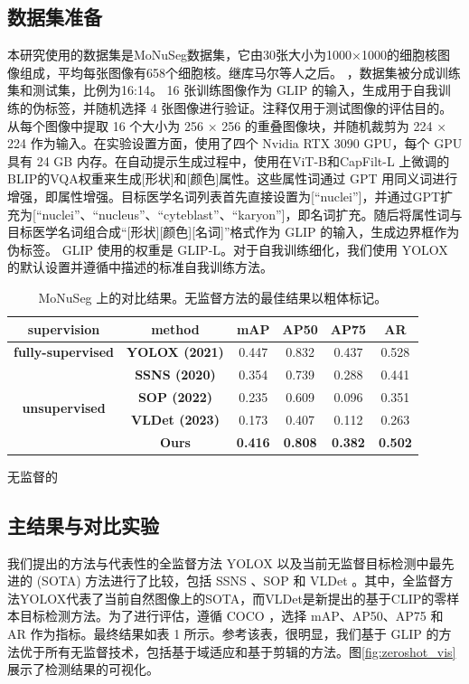 \subsection{数据集准备}
本研究使用的数据集是MoNuSeg数据集\cite{kumar2017dataset}，它由30张大小为1000×1000的细胞核图像组成，平均每张图像有658个细胞核。继库马尔等人之后。 \cite{kumar2017dataset}，数据集被分成训练集和测试集，比例为16:14。 16 张训练图像作为 GLIP 的输入，生成用于自我训练的伪标签，并随机选择 4 张图像进行验证。注释仅用于测试图像的评估目的。从每个图像中提取 16 个大小为 256 × 256 的重叠图像块，并随机裁剪为 224 × 224 作为输入。在实验设置方面，使用了四个 Nvidia RTX 3090 GPU，每个 GPU 具有 24 GB 内存。在自动提示生成过程中，使用在ViT-B和CapFilt-L \cite{li2022blip}上微调的BLIP的VQA权重来生成[形状]和[颜色]属性。这些属性词通过 GPT \cite{radford2019language} 用同义词进行增强，即属性增强。目标医学名词列表首先直接设置为[“nuclei”]，并通过GPT扩充为[“nuclei”、“nucleus”、“cyteblast”、“karyon”]，即名词扩充。随后将属性词与目标医学名词组合成“[形状][颜色][名词]”格式作为 GLIP 的输入，生成边界框作为伪标签。 GLIP 使用的权重是 GLIP-L。对于自我训练细化，我们使用 YOLOX 的默认设置并遵循\cite{dopido2013semisupervised}中描述的标准自我训练方法。
\begin{table}[htbp]
  \centering
  \caption{MoNuSeg \cite{kumar2017dataset} 上的对比结果。无监督方法的最佳结果以粗体标记。}
  \label{tab:zeroshot_comparison}
  \begin{tabular}{c|c|cccc}
    \hline
    \textbf{supervision} & \textbf{method} & \textbf{mAP} & \textbf{AP50} & \textbf{AP75} & \textbf{AR} \\ \hline
    \textbf{fully-supervised} & \textbf{YOLOX (2021)} & 0.447 & 0.832 & 0.437 & 0.528 \\ \hline
    \multirow{4}{*}{\textbf{unsupervised}} & \textbf{SSNS (2020)} & 0.354 & 0.739 & 0.288 & 0.441 \\
     & \textbf{SOP (2022)} & 0.235 & 0.609 & 0.096 & 0.351 \\
     & \textbf{VLDet (2023)} & 0.173 & 0.407 & 0.112 & 0.263 \\
     & \textbf{Ours} & \textbf{0.416} & \textbf{0.808} & \textbf{0.382} & \textbf{0.502} \\ \hline
  \end{tabular}
\end{table}

无监督的
\subsection{主结果与对比实验}
我们提出的方法与代表性的全监督方法 YOLOX \cite{ge2021yolox} 以及当前无监督目标检测中最先进的 (SOTA) 方法进行了比较，包括 SSNS \cite{sahasrabudhe2020self}、SOP \cite{le2022unsupervised} 和 VLDet \cite{lin2022learning}。其中，全监督方法YOLOX代表了当前自然图像上的SOTA，而VLDet是新提出的基于CLIP的零样本目标检测方法。为了进行评估，遵循 COCO \cite{lin2014microsoft}，选择 mAP、AP50、AP75 和 AR 作为指标。最终结果如表 1 所示。参考该表，很明显，我们基于 GLIP 的方法优于所有无监督技术，包括基于域适应和基于剪辑的方法。图\ref{fig:zeroshot_vis} 展示了检测结果的可视化。

